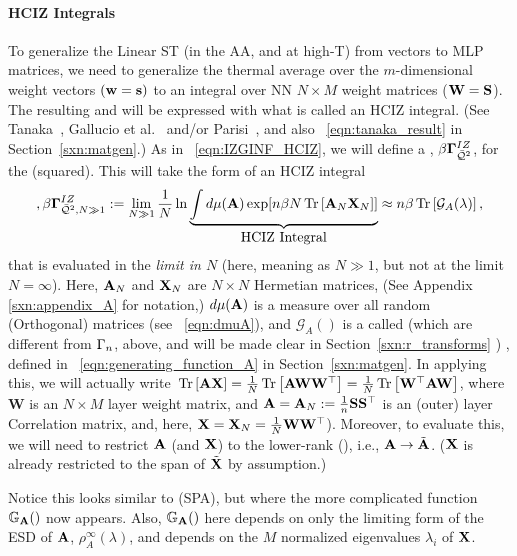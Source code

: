 \paragraph{HCIZ Integrals}
To generalize the Linear ST \Perceptron (in the AA, and at high-T) from \Perceptron vectors to MLP matrices,
we need to generalize the thermal average over the $m$-dimensional \Perceptron weight vectors $({\mathbf{w}}={\mathbf{s}})$
to an integral over NN \Student $N \times M$ weight matrices (${\mathbf{W}}=\mathbf{S}$).
The resulting \PartitionFunction and \FreeEnergy will be expressed with what is called an HCIZ integral.
(See Tanaka~\cite{Tanaka2007, Tanaka2008}, Gallucio et al.~\cite{Bouchaud1998} and/or Parisi~\cite{PP95}, and also \EQN~\ref{eqn:tanaka_result} in Section~\ref{sxn:matgen}.)
As in \EQN~\ref{eqn:IZGINF_HCIZ}, we will define a \emph{\LayerQuality \GeneratingFunction}, $\beta\mathbf{\Gamma}^{IZ}_{\bar{\mathcal{Q}}^{2}}$, for the \LayerQuality (squared).
This will take the form of an HCIZ integral
\begin{align}
\label{eqn:hciz_prelim},
\beta\mathbf{\Gamma}^{IZ}_{\bar{\mathcal{Q}}^{2},N\gg 1} := \lim_{N\gg 1}\frac{1}{N}\ln \underbrace{\int d\mu(\mathbf{A}) \exp[n\beta N\mbox{}\operatorname{Tr}\left[\mathbf{A}_N\mathbf{X}_N\right]] }_{\mbox{HCIZ Integral}} 
  \approx n\beta\mbox{}\operatorname{Tr}\left[\mathcal{G}_{A}(\lambda)\right]  ,
\end{align}
that is evaluated in the \WideLayer\emph{\LargeN limit in $N$} (here, meaning as $N \gg 1$, but not at the limit $N=\infty$).
Here,  $\mathbf{A}_N$ and $\mathbf{X}_N$ are $N \times N$ Hermetian matrices, (See Appendix \ref{sxn:appendix_A} for notation,) $d\mu(\mathbf{A})$ is a measure
over all random (Orthogonal) matrices (see \EQN~\ref{eqn:dmuA}),
and $\mathcal{G}_{A}()$ is a called  \GEN 
(which are different from $\Gamma_{n}$, above, and will be made clear in Section~\ref{sxn:r_transforms} ) , defined in \EQN~\ref{eqn:generating_function_A} in Section~\ref{sxn:matgen}. 
In applying this, we will actually write $\mbox{}\operatorname{Tr}\left[\mathbf{A}\mathbf{X}\right]=\tfrac{1}{N}\mbox{}\operatorname{Tr}\left[\mathbf{A}{\mathbf{W}}{\mathbf{W}}^{\top}\right]=\tfrac{1}{N}\mbox{}\operatorname{Tr}\left[{\mathbf{W}}^{\top}\mathbf{A}{\mathbf{W}}\right]$,
where $\mathbf{W}$ is an $N \times M$ layer weight matrix, and $\mathbf{A}=\mathbf{A}_N:=\tfrac{1}{n}{\mathbf{S}}{\mathbf{S}}^{\top}$ is an (outer) layer
Correlation matrix, and, here,  $\mathbf{X}=\mathbf{X}_N=\tfrac{1}{N}{\mathbf{W}}{\mathbf{W}}^{\top}$).
Moreover, to evaluate this, we will need to restrict $\mathbf{A}$ (and $\mathbf{X}$)
to the lower-rank \EffectiveCorrelationSpace (\ECS),  i.e., $\mathbf{A}\rightarrow\tilde{\mathbf{A}}$. ($\mathbf{X}$ is already restricted to the span of $\tilde{\mathbf{X}}$ by \ECS assumption.)

Notice this looks similar to \SaddlePointApproximation (SPA), but where the more complicated function
$\mathbb{G}_{\mathbf{A}}()$ now appears.
Also, $\mathbb{G}_{\mathbf{A}}()$ here depends on only the limiting form of the ESD of $\mathbf{A}$, $\rho^{\infty}_{A}(\lambda)$,
and depends on the $M$ normalized eigenvalues $\lambda_{i}$ of $\mathbf{X}$.


